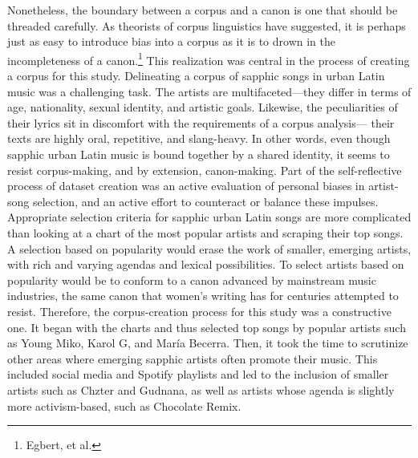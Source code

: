 \documentclass[
  letterpaper,
  DIV=11,
  numbers=noendperiod]{scrartcl}
\begin{document}
Nonetheless, the boundary between a corpus and a canon is one that
should be threaded carefully. As theorists of corpus linguistics have
suggested, it is perhaps just as easy to introduce bias into a corpus as
it is to drown in the incompleteness of a canon.\footnote{Egbert, et al.}
This realization was central in the process of creating a corpus for
this study. Delineating a corpus of sapphic songs in urban Latin music
was a challenging task. The artists are multifaceted---they differ in
terms of age, nationality, sexual identity, and artistic goals.
Likewise, the peculiarities of their lyrics sit in discomfort with the
requirements of a corpus analysis--- their texts are highly oral,
repetitive, and slang-heavy. In other words, even though sapphic urban
Latin music is bound together by a shared identity, it seems to resist
corpus-making, and by extension, canon-making. Part of the
self-reflective process of dataset creation was an active evaluation of
personal biases in artist-song selection, and an active effort to
counteract or balance these impulses. Appropriate selection criteria for
sapphic urban Latin songs are more complicated than looking at a chart
of the most popular artists and scraping their top songs. A selection
based on popularity would erase the work of smaller, emerging artists,
with rich and varying agendas and lexical possibilities. To select
artists based on popularity would be to conform to a canon advanced by
mainstream music industries, the same canon that women's writing has for
centuries attempted to resist. Therefore, the corpus-creation process
for this study was a constructive one. It began with the charts and thus
selected top songs by popular artists such as Young Miko, Karol G, and
María Becerra. Then, it took the time to scrutinize other areas where
emerging sapphic artists often promote their music. This included social
media and Spotify playlists and led to the inclusion of smaller artists
such as Chzter and Gudnana, as well as artists whose agenda is slightly
more activism-based, such as Chocolate Remix.
\end{document}
